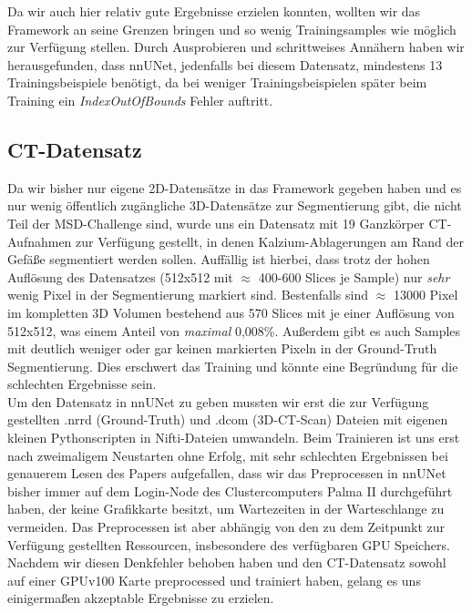 Da wir auch hier relativ gute Ergebnisse erzielen konnten, wollten wir das Framework an seine Grenzen bringen und so wenig Trainingsamples wie möglich zur Verfügung stellen. Durch Ausprobieren und schrittweises Annähern haben wir herausgefunden, dass nnUNet, jedenfalls bei diesem Datensatz, mindestens 13 Trainingsbeispiele benötigt, da bei weniger Trainingsbeispielen später beim Training ein \textit{IndexOutOfBounds} Fehler auftritt.


\subsection{CT-Datensatz}
Da wir bisher nur eigene 2D-Datensätze in das Framework gegeben haben und es nur wenig öffentlich zugängliche 3D-Datensätze zur Segmentierung gibt, die nicht Teil der MSD-Challenge \cite{msdChallenge} sind, wurde uns ein Datensatz mit 19 Ganzkörper CT-Aufnahmen zur Verfügung gestellt, in denen Kalzium-Ablagerungen am Rand der Gefäße segmentiert werden sollen.
Auffällig ist hierbei, dass trotz der hohen Auflösung des Datensatzes (512x512 mit $\approx$ 400-600 Slices je Sample) nur \textit{sehr} wenig Pixel in der Segmentierung markiert sind. Bestenfalls sind $\approx$ 13000 Pixel im kompletten 3D Volumen bestehend aus 570 Slices mit je einer Auflösung von 512x512, was einem Anteil von \textit{maximal} 0,008\%. Außerdem gibt es auch Samples mit deutlich weniger oder gar keinen markierten Pixeln in der Ground-Truth Segmentierung.  Dies erschwert das Training und könnte eine Begründung für die  schlechten Ergebnisse sein.\\
Um den Datensatz in nnUNet zu geben mussten wir erst die zur Verfügung gestellten .nrrd (Ground-Truth) und .dcom (3D-CT-Scan) Dateien mit eigenen kleinen Pythonscripten \cite{autoMLGithub} in Nifti-Dateien umwandeln. Beim Trainieren ist uns erst nach zweimaligem Neustarten ohne Erfolg, mit sehr schlechten Ergebnissen bei genauerem Lesen des Papers aufgefallen, dass wir das Preprocessen in nnUNet bisher immer auf dem Login-Node des Clustercomputers Palma II durchgeführt haben, der keine Grafikkarte besitzt, um Wartezeiten in der Warteschlange zu vermeiden. Das Preprocessen ist aber abhängig von den zu dem Zeitpunkt zur Verfügung gestellten Ressourcen, insbesondere des verfügbaren GPU Speichers. Nachdem wir diesen Denkfehler behoben haben und den CT-Datensatz sowohl auf einer GPUv100 Karte preprocessed und trainiert haben, gelang es uns  einigermaßen akzeptable Ergebnisse zu erzielen. 

